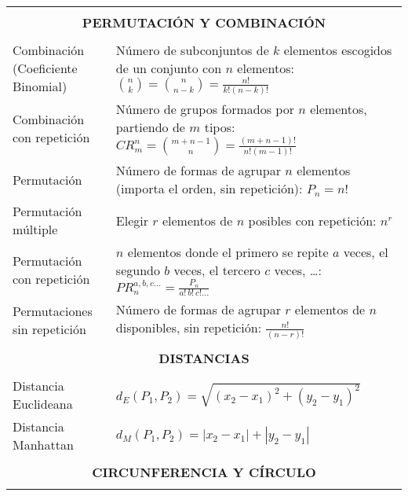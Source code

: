 \begin{center}
{\renewcommand{\arraystretch}{1.4}
\begin{tabular}{|p{}|p{}|}
\hline
\multicolumn{2}{|c|}{} \\
\multicolumn{2}{|c|}{\textbf{PERMUTACIÓN Y COMBINACIÓN}} \\
\multicolumn{2}{|c|}{} \\ \hline

Combinación (Coeficiente Binomial) &
Número de subconjuntos de $k$ elementos escogidos de un conjunto con $n$ elementos:
$\displaystyle \binom{n}{k} = \binom{n}{n-k} = \frac{n!}{k!(n-k)!}$ \\ \hline

Combinación con repetición &
Número de grupos formados por $n$ elementos, partiendo de $m$ tipos:
$\displaystyle CR_{m}^{n} = \binom{m+n-1}{n} = \frac{(m+n-1)!}{n!(m-1)!}$ \\ \hline

Permutación &
Número de formas de agrupar $n$ elementos (importa el orden, sin repetición):
$P_{n} = n!$ \\ \hline

Permutación múltiple &
Elegir $r$ elementos de $n$ posibles con repetición:
$\displaystyle n^{r}$ \\ \hline

Permutación con repetición &
$n$ elementos donde el primero se repite $a$ veces, el segundo $b$ veces, el tercero $c$ veces, \ldots:
$\displaystyle PR_{n}^{a,b,c\ldots} = \frac{P_{n}}{a!\,b!\,c!\ldots}$ \\ \hline

Permutaciones sin repetición &
Número de formas de agrupar $r$ elementos de $n$ disponibles, sin repetición:
$\displaystyle \frac{n!}{(n-r)!}$ \\ \hline

\multicolumn{2}{|c|}{} \\
\multicolumn{2}{|c|}{\textbf{DISTANCIAS}} \\
\multicolumn{2}{|c|}{} \\ \hline

Distancia Euclideana &
$\displaystyle d_{E}(P_{1},P_{2}) = \sqrt{(x_{2}-x_{1})^{2}+(y_{2}-y_{1})^{2}}$ \\ \hline

Distancia Manhattan &
$\displaystyle d_{M}(P_{1}, P_{2}) = |x_{2} - x_{1}| + |y_{2} - y_{1}|$ \\ \hline

\multicolumn{2}{|c|}{} \\
\multicolumn{2}{|c|}{\textbf{CIRCUNFERENCIA Y CÍRCULO}} \\
\multicolumn{2}{|c|}{} \\ \hline


\end{tabular}}
\end{center}
